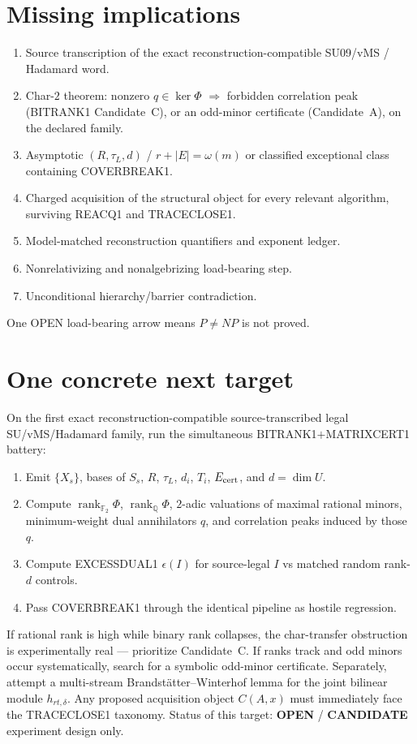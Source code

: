 \documentclass[11pt]{article}
\begin{document}
\section*{Missing implications}
\begin{enumerate}
\item Source transcription of the exact reconstruction-compatible SU09/vMS / Hadamard word.
\item Char-$2$ theorem: nonzero $q\in\ker\Phi$ $\Rightarrow$ forbidden correlation peak
(BITRANK1 Candidate~C), or an odd-minor certificate (Candidate~A), on the declared family.
\item Asymptotic $(R,\tau_L,d)$ / $r+|E|=\omega(m)$ or classified exceptional class containing
COVERBREAK1.
\item Charged acquisition of the structural object for every relevant algorithm, surviving
REACQ1 and TRACECLOSE1.
\item Model-matched reconstruction quantifiers and exponent ledger.
\item Nonrelativizing and nonalgebrizing load-bearing step.
\item Unconditional hierarchy/barrier contradiction.
\end{enumerate}
One OPEN load-bearing arrow means $P\neq NP$ is not proved.

\section*{One concrete next target}
On the first exact reconstruction-compatible source-transcribed legal SU/vMS/Hadamard family,
run the simultaneous BITRANK1$+$MATRIXCERT1 battery:
\begin{enumerate}
\item Emit $\{X_s\}$, bases of $S_s$, $R$, $\tau_L$, $d_i$, $T_i$, $E_{\rm cert}$, and $d=\dim U$.
\item Compute $\operatorname{rank}_{\mathbb F_2}\Phi$, $\operatorname{rank}_{\mathbb Q}\Phi$,
$2$-adic valuations of maximal rational minors, minimum-weight dual annihilators $q$, and
correlation peaks induced by those $q$.
\item Compute EXCESSDUAL1 $\epsilon(I)$ for source-legal $I$ vs matched random rank-$d$ controls.
\item Pass COVERBREAK1 through the identical pipeline as hostile regression.
\end{enumerate}
If rational rank is high while binary rank collapses, the char-transfer obstruction is
experimentally real --- prioritize Candidate~C. If ranks track and odd minors occur
systematically, search for a symbolic odd-minor certificate. Separately, attempt a
multi-stream Brandst\"atter--Winterhof lemma for the joint bilinear module $h_{rt,\delta}$.
Any proposed acquisition object $C(A,x)$ must immediately face the TRACECLOSE1 taxonomy.
Status of this target: \textbf{OPEN} / \textbf{CANDIDATE} experiment design only.
\end{document}
